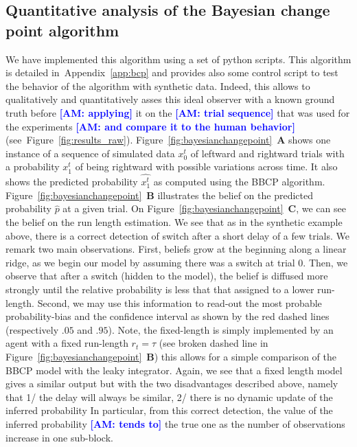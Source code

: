 \documentclass[12pt,english]{article}%
\newcommand{\seeFig}[1]{Figure~\ref{fig:#1}}
\newcommand{\seeApp}[1]{Appendix~\ref{app:#1}}
\newcommand{\AM}[1]{\textbf{\textcolor{blue}{[AM: #1]}}}
\begin{document}
\subsection{Quantitative analysis of the Bayesian change point algorithm}
We have implemented this algorithm using a set of python scripts.
This algorithm is detailed in~\seeApp{bcp} and provides also some control script
to test the behavior of the algorithm with synthetic data.
Indeed, this allows to qualitatively and quantitatively asses 
this ideal observer with a known ground truth before \AM{applying} it 
on the \AM{trial sequence} that was used for the experiments \AM{and compare it to the human behavior} (see~\seeFig{results_raw}).
\seeFig{bayesianchangepoint}~\textbf{A} shows 
one instance of a sequence of simulated data $x_0^t$
of leftward and rightward trials with a probability $x_1^t$
of being rightward with possible variations across time. 
It also shows the predicted probability $\hat{x_1^t}$ 
as computed using the BBCP algorithm. 
\seeFig{bayesianchangepoint}~\textbf{B} illustrates 
the belief on the predicted probability $\hat{p}$ at a given trial.
On \seeFig{bayesianchangepoint}~\textbf{C}, 
we can see the belief on the run length estimation.
We see that as in the synthetic example above,
there is a correct detection of switch after a short delay of a few trials.
We remark two main observations. 
First, beliefs grow at the beginning along a linear ridge, 
as we begin our model by assuming there was a switch at trial $0$. 
Then, we observe that after a switch (hidden to the model), 
the belief is diffused more strongly until the relative probability 
is less that that assigned to a lower run-length.
Second, we may use this information to read-out the most probable probability-bias and the confidence interval 
as shown by the red dashed lines (respectively $.05$ and $.95$).
Note, the fixed-length is simply implemented 
by an agent with a fixed run-length $r_t=\tau$ (see broken dashed line in \seeFig{bayesianchangepoint}~\textbf{B})
this allows for a simple comparison of the BBCP model with the leaky integrator.
Again, we see that a fixed length model gives a similar output
but with the two disadvantages described above,  namely that 
1/ the delay will always be similar, 
2/ there is no dynamic update of the inferred probability
In particular, from this correct detection,
the value of the inferred probability \AM{tends to} the true one as the number of observations increase in one sub-block.
\end{document}
